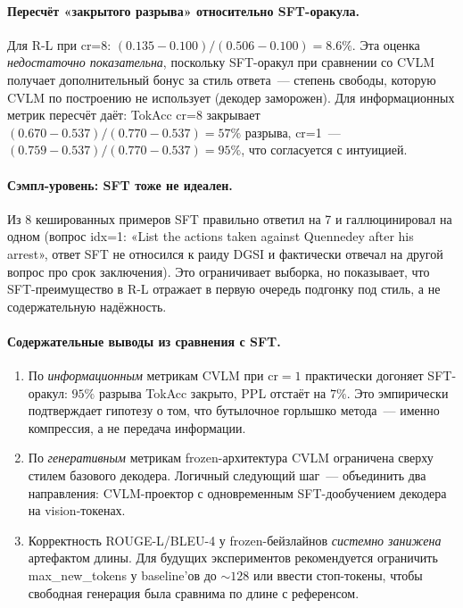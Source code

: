 \documentclass[a4paper,12pt]{extarticle}
\begin{document}
\paragraph{Пересчёт «закрытого разрыва» относительно SFT-оракула.} Для R-L при cr=8: $(0.135 - 0.100) / (0.506 - 0.100) = 8.6\%$. Эта оценка \emph{недостаточно показательна}, поскольку SFT-оракул при сравнении со CVLM получает дополнительный бонус за стиль ответа~--- степень свободы, которую CVLM по построению не использует (декодер заморожен). Для информационных метрик пересчёт даёт: TokAcc cr=8 закрывает $(0.670 - 0.537) / (0.770 - 0.537) = 57\%$ разрыва, cr=1~--- $(0.759 - 0.537) / (0.770 - 0.537) = 95\%$, что согласуется с интуицией.

\paragraph{Сэмпл-уровень: SFT тоже не идеален.} Из 8 кешированных примеров SFT правильно ответил на 7 и галлюцинировал на одном (вопрос idx=1: «List the actions taken against Quennedey after his arrest», ответ SFT не относился к раиду DGSI и фактически отвечал на другой вопрос про срок заключения). Это ограничивает выборка, но показывает, что SFT-преимущество в R-L отражает в первую очередь подгонку под стиль, а не содержательную надёжность.

\paragraph{Содержательные выводы из сравнения с SFT.}
\begin{enumerate}
    \item По \emph{информационным} метрикам CVLM при $\text{cr}=1$ практически догоняет SFT-оракул: $95\%$ разрыва TokAcc закрыто, PPL отстаёт на $7\%$. Это эмпирически подтверждает гипотезу о том, что бутылочное горлышко метода~--- именно компрессия, а не передача информации.
    \item По \emph{генеративным} метрикам frozen-архитектура CVLM ограничена сверху стилем базового декодера. Логичный следующий шаг~--- объединить два направления: CVLM-проектор с одновременным SFT-дообучением декодера на vision-токенах.
    \item Корректность ROUGE-L/BLEU-4 у frozen-бейзлайнов \emph{системно занижена} артефактом длины. Для будущих экспериментов рекомендуется ограничить max\_new\_tokens у baseline'ов до $\sim 128$ или ввести стоп-токены, чтобы свободная генерация была сравнима по длине с референсом.
\end{enumerate}
\end{document}
